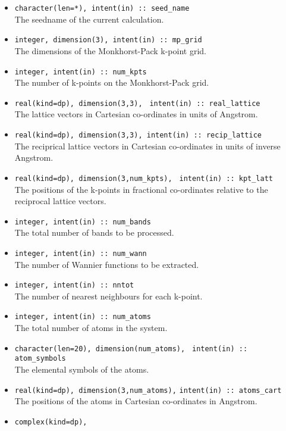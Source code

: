\begin{itemize}
\item \verb#character(len=*), intent(in) :: seed_name#\\ The seedname
  of the current calculation.
\item \verb#integer, dimension(3), intent(in) :: mp_grid#\\ The
  dimensions of the {Monkhorst-Pack} k-point grid.
\item \verb#integer, intent(in) :: num_kpts#\\ The number of k-points on
  the {Monkhorst-Pack} grid.
\item \verb#real(kind=dp), dimension(3,3),#
      \verb# intent(in) :: real_lattice#\\ The lattice vectors in
      Cartesian co-ordinates in units of Angstrom. 
\item \verb#real(kind=dp), dimension(3,3), intent(in) :: recip_lattice#\\
  The reciprical lattice vectors in Cartesian co-ordinates in units of inverse Angstrom.
\item \verb#real(kind=dp), dimension(3,num_kpts),#
      \verb# intent(in) :: kpt_latt#\\ The positions of the k-points in
      fractional co-ordinates relative to the reciprocal lattice
      vectors.
\item \verb#integer, intent(in) :: num_bands#\\ The total number of
      bands to be processed.
\item \verb#integer, intent(in) :: num_wann#\\ The number of Wannier
  functions to be extracted.
\item \verb#integer, intent(in) :: nntot#\\ The number of
  nearest neighbours for each k-point.
\item \verb#integer, intent(in) :: num_atoms#\\ The total number of atoms
  in the system.
\item \verb#character(len=20), dimension(num_atoms),#
      \verb# intent(in) :: atom_symbols#\\ The elemental symbols of
      the atoms.
\item \verb#real(kind=dp), dimension(3,num_atoms),#
      \verb#intent(in) :: atoms_cart#\\ The positions of the atoms in
      Cartesian co-ordinates in Angstrom.
\item \verb#complex(kind=dp),#

\end{itemize}
